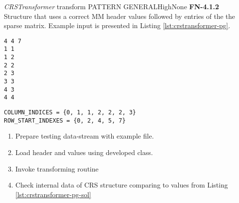 \begin{testcase}{\emph{CRSTransformer} transform PATTERN GENERAL}{High}{None}
	{
		\textbf{FN-4.1.2}
	}
	{
		Structure that uses a correct \gls{MM} header values followed by entries of the the sparse matrix. Example input is presented in Listing \ref{lst:crstransformer-pg}. 	
	}
	\begin{lstlisting}[label={lst:crstransformer-pg},
	basicstyle=\small,caption={\gls{MM} format data example}, frame=single]
%%MatrixMarket matrix coordinate pattern general
4 4 7
1 1 
1 2 
2 2 
2 3 
3 3 
4 3 
4 4 
	\end{lstlisting}
	\begin{lstlisting}[label={lst:crstransformer-pg-sol},
	basicstyle=\small,caption={\gls{CRS} format internal data example}, frame=single]
COLUMN_INDICES = {0, 1, 1, 2, 2, 2, 3}
ROW_START_INDEXES = {0, 2, 4, 5, 7}
	\end{lstlisting}
	{
		\begin{enumerate}
			\item Prepare testing data-stream with example file.
			\item Load header and values using developed class.
			\item Invoke transforming routine 
			\item
			{
				Check internal data of \gls{CRS} structure comparing to values from Listing \ref{lst:crstransformer-pg-sol} 
			}
		\end{enumerate}
	}
\end{testcase}

